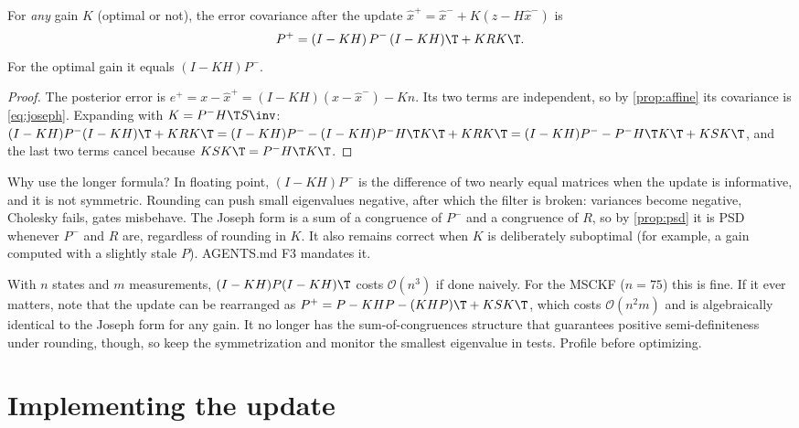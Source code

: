 \begin{proposition}
\label{prop:joseph}
For \emph{any} gain $K$ (optimal or not), the error covariance after the update
$\hat x^+ = \hat x^- + K(z - H\hat x^-)$ is
\begin{equation}
  P^+ = (I - KH)\,P^-\,(I - KH)\T + K R K\T .
  \label{eq:joseph}
\end{equation}
For the optimal gain it equals $(I - KH)P^-$.
\end{proposition}
\begin{proof}
The posterior error is $e^+ = x - \hat x^+ = (I - KH)(x - \hat x^-) - Kn$. Its two terms are independent,
so by \cref{prop:affine} its covariance is \eqref{eq:joseph}. Expanding with $K = P^-H\T S\inv$:
$(I-KH)P^-(I-KH)\T + KRK\T = (I-KH)P^- - (I-KH)P^-H\T K\T + KRK\T = (I-KH)P^- - P^-H\T K\T + K S K\T$,
and the last two terms cancel because $KSK\T = P^-H\T K\T$.
\end{proof}

Why use the longer formula? In floating point, $(I - KH)P^-$ is the difference of two nearly equal
matrices when the update is informative, and it is not symmetric. Rounding can push small eigenvalues
negative, after which the filter is broken: variances become negative, Cholesky fails, gates misbehave.
The Joseph form is a sum of a congruence of $P^-$ and a congruence of $R$, so by \cref{prop:psd} it is PSD
whenever $P^-$ and $R$ are, regardless of rounding in $K$. It also remains correct when $K$ is
deliberately suboptimal (for example, a gain computed with a slightly stale $P$). AGENTS.md F3 mandates
it.

\begin{implnote}
With $n$ states and $m$ measurements, $(I - KH)P(I-KH)\T$ costs $\mathcal{O}(n^3)$ if done naively. For the
MSCKF ($n = 75$) this is fine. If it ever matters, note that the update can be rearranged as
$P^+ = P - KHP - (KHP)\T + K S K\T$, which costs $\mathcal{O}(n^2 m)$ and is algebraically identical to the
Joseph form for any gain. It no longer has the sum-of-congruences structure that guarantees positive
semi-definiteness under rounding, though, so keep the symmetrization and monitor the smallest eigenvalue
in tests. Profile before optimizing.
\end{implnote}

\section{Implementing the update}


